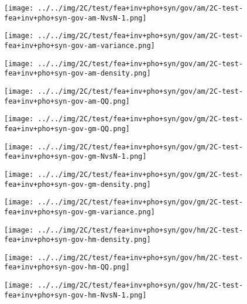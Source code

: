 \begin{figure}[H]
\centering	\texttt{[image: ../../img/2C/test/fea+inv+pho+syn/gov/am/2C-test-fea+inv+pho+syn-gov-am-NvsN-1.png]}
\end{figure}
\begin{figure}[H]
\centering	\texttt{[image: ../../img/2C/test/fea+inv+pho+syn/gov/am/2C-test-fea+inv+pho+syn-gov-am-variance.png]}
\end{figure}
\begin{figure}[H]
\centering	\texttt{[image: ../../img/2C/test/fea+inv+pho+syn/gov/am/2C-test-fea+inv+pho+syn-gov-am-density.png]}
\end{figure}
\begin{figure}[H]
\centering	\texttt{[image: ../../img/2C/test/fea+inv+pho+syn/gov/am/2C-test-fea+inv+pho+syn-gov-am-QQ.png]}
\end{figure}
\begin{figure}[H]
\centering	\texttt{[image: ../../img/2C/test/fea+inv+pho+syn/gov/gm/2C-test-fea+inv+pho+syn-gov-gm-QQ.png]}
\end{figure}
\begin{figure}[H]
\centering	\texttt{[image: ../../img/2C/test/fea+inv+pho+syn/gov/gm/2C-test-fea+inv+pho+syn-gov-gm-NvsN-1.png]}
\end{figure}
\begin{figure}[H]
\centering	\texttt{[image: ../../img/2C/test/fea+inv+pho+syn/gov/gm/2C-test-fea+inv+pho+syn-gov-gm-density.png]}
\end{figure}
\begin{figure}[H]
\centering	\texttt{[image: ../../img/2C/test/fea+inv+pho+syn/gov/gm/2C-test-fea+inv+pho+syn-gov-gm-variance.png]}
\end{figure}
\begin{figure}[H]
\centering	\texttt{[image: ../../img/2C/test/fea+inv+pho+syn/gov/hm/2C-test-fea+inv+pho+syn-gov-hm-density.png]}
\end{figure}
\begin{figure}[H]
\centering	\texttt{[image: ../../img/2C/test/fea+inv+pho+syn/gov/hm/2C-test-fea+inv+pho+syn-gov-hm-QQ.png]}
\end{figure}
\begin{figure}[H]
\centering	\texttt{[image: ../../img/2C/test/fea+inv+pho+syn/gov/hm/2C-test-fea+inv+pho+syn-gov-hm-NvsN-1.png]}
\end{figure}
